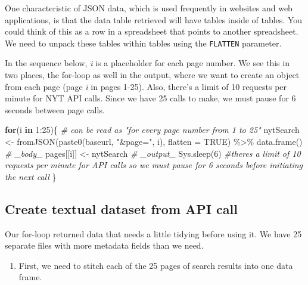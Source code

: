 \documentclass[
  krantz2]{krantz}
\makeatletter
\newenvironment{Shaded}{\begin{snugshade}}{\end{snugshade}}
\newcommand{\AttributeTok}[1]{\textcolor[rgb]{0.61,0.61,0.61}{#1}}
\newcommand{\CommentTok}[1]{\textcolor[rgb]{0.37,0.37,0.37}{\textit{#1}}}
\newcommand{\ConstantTok}[1]{\textcolor[rgb]{0,0,0}{#1}}
\newcommand{\ControlFlowTok}[1]{\textcolor[rgb]{0.27,0.27,0.27}{\textbf{#1}}}
\newcommand{\DecValTok}[1]{\textcolor[rgb]{0.06,0.06,0.06}{#1}}
\newcommand{\FunctionTok}[1]{\textcolor[rgb]{0,0,0}{#1}}
\newcommand{\NormalTok}[1]{#1}
\newcommand{\OtherTok}[1]{\textcolor[rgb]{0.37,0.37,0.37}{#1}}
\newcommand{\SpecialCharTok}[1]{\textcolor[rgb]{0,0,0}{#1}}
\newcommand{\StringTok}[1]{\textcolor[rgb]{0.5,0.5,0.5}{#1}}
\providecommand{\tightlist}{%
  \setlength{\itemsep}{0pt}\setlength{\parskip}{0pt}}
\newenvironment{kframe}{%
\medskip{}
\setlength{\fboxsep}{.8em}
 \def\at@end@of@kframe{}%
 \ifinner\ifhmode%
  \def\at@end@of@kframe{\end{minipage}}%
  \begin{minipage}{\columnwidth}%
 \fi\fi%
 \def\FrameCommand##1{\hskip\@totalleftmargin \hskip-\fboxsep
 \colorbox{shadecolor}{##1}\hskip-\fboxsep
     \hskip-\linewidth \hskip-\@totalleftmargin \hskip\columnwidth}%
 \MakeFramed {\advance\hsize-\width
   \@totalleftmargin\z@ \linewidth\hsize
   \@setminipage}}%
 {\par\unskip\endMakeFramed%
 \at@end@of@kframe}
\renewenvironment{Shaded}{\begin{kframe}}{\end{kframe}}
\makeatother
\begin{document}
One characteristic of JSON data, which is used frequently in websites and web applications, is that the data table retrieved will have tables inside of tables. You could think of this as a row in a spreadsheet that points to another spreadsheet. We need to unpack these tables within tables using the \texttt{FLATTEN} parameter.

In the sequence below, \emph{i} is a placeholder for each page number. We see this in two places, the for-loop as well in the output, where we want to create an object from each page (page \emph{i} in pages 1-25). Also, there's a limit of 10 requests per minute for NYT API calls. Since we have 25 calls to make, we must pause for 6 seconds between page calls.

\begin{Shaded}
\begin{Highlighting}[]
\ControlFlowTok{for}\NormalTok{(i }\ControlFlowTok{in} \DecValTok{1}\SpecialCharTok{:}\DecValTok{25}\NormalTok{)\{ }\CommentTok{\# can be read as "for every page number from 1 to 25"}
\NormalTok{    nytSearch }\OtherTok{\textless{}{-}} \FunctionTok{fromJSON}\NormalTok{(}\FunctionTok{paste0}\NormalTok{(baseurl, }\StringTok{"\&page="}\NormalTok{, i), }\AttributeTok{flatten =} \ConstantTok{TRUE}\NormalTok{) }\SpecialCharTok{\%\textgreater{}\%} \FunctionTok{data.frame}\NormalTok{() }\CommentTok{\# \_body\_}
\NormalTok{    pages[[i]] }\OtherTok{\textless{}{-}}\NormalTok{ nytSearch }\CommentTok{\# \_output\_}
    \FunctionTok{Sys.sleep}\NormalTok{(}\DecValTok{6}\NormalTok{) }\CommentTok{\#there\textquotesingle{}s a limit of 10 requests per minute for API calls so we must pause for 6 seconds before initiating the next call}
\NormalTok{\}}
\end{Highlighting}
\end{Shaded}

\hypertarget{api-dataset}{%
\subsection{Create textual dataset from API call}\label{api-dataset}}

Our for-loop returned data that needs a little tidying before using it. We have 25 separate files with more metadata fields than we need.

\begin{enumerate}
\def\labelenumi{\arabic{enumi}.}
\tightlist
\item
  First, we need to stitch each of the 25 pages of search results into one data frame.
\end{enumerate}
\end{document}
